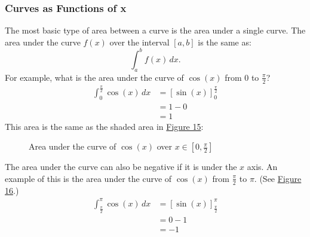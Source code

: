 \documentclass[12pt]{article}
\begin{document}
\subsubsection{Curves as Functions of x}
The most basic type of area between a curve is the area under a single curve. The area under the curve $f(x)$ over the interval $[a, b]$ is the same as:
\[ \int_a^b f(x) \, dx. \]
For example, what is the area under the curve of $\cos(x)$ from $0$ to $\frac{\pi}{2}$?
\begin{align*}
    \int_0^{\frac{\pi}{2}} \cos(x) \, dx & = \left[ \sin(x) \right]_0^{\frac{\pi}{2}} \\[6pt]
                                         & = 1 - 0                                    \\
                                         & = 1
\end{align*}
This area is the same as the shaded area in \hyperref[fig:auccosx1]{Figure 15}:

\begin{figure}[H]
    \begin{center}
        \caption{Area under the curve of $\cos(x)$ over $x \in [0, \frac{\pi}{2}]$}
        \label{fig:auccosx1}
    \end{center}
\end{figure}

The area under the curve can also be negative if it is under the $x$ axis. An example of this is the area under the curve of $\cos(x)$ from $\frac{\pi}{2}$ to $\pi$. (See \hyperref[fig:auccosx2]{Figure 16}.)
\begin{align*}
    \int_{\frac{\pi}{2}}^\pi \cos(x) \, dx & = \left[ \sin(x) \right]_{\frac{\pi}{2}}^\pi \\[6pt]
                                           & = 0 - 1                                      \\
                                           & = -1
\end{align*}
\end{document}

